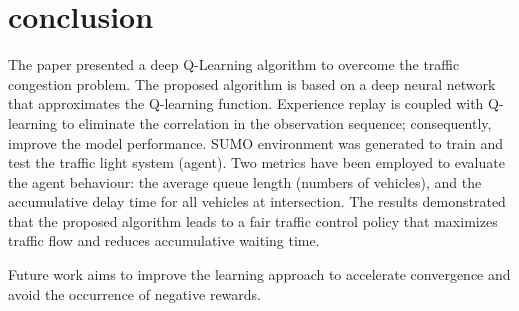 \documentclass[conference]{IEEEtran}
\begin{document}

\section{conclusion}\label{Conclusion}
The paper presented a deep Q-Learning algorithm to overcome the traffic congestion problem. The proposed algorithm is based on a deep neural network that approximates the Q-learning function. Experience replay is coupled with Q-learning to eliminate the correlation in the observation sequence; consequently, improve the model performance. SUMO environment was generated to train and test the traffic light system (agent). Two metrics have been employed to evaluate the agent behaviour: the average queue length (numbers of vehicles), and the accumulative delay time for all vehicles at intersection. The results demonstrated that the proposed algorithm leads to a fair traffic control policy that maximizes traffic flow and reduces accumulative waiting time. 

Future work aims to improve the learning approach to accelerate convergence and avoid the occurrence of negative rewards. 



\end{document}
